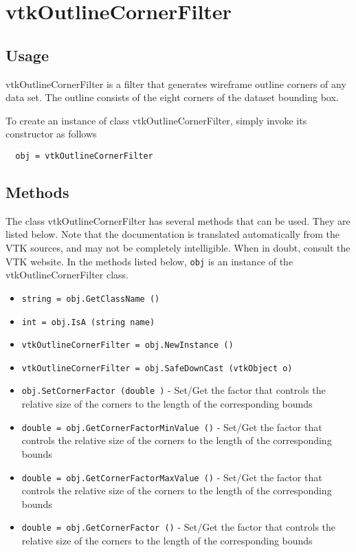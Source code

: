 \section{vtkOutlineCornerFilter}

\subsection{Usage}

 vtkOutlineCornerFilter is a filter that generates wireframe outline corners of any 
 data set. The outline consists of the eight corners of the dataset 
 bounding box.

To create an instance of class vtkOutlineCornerFilter, simply
invoke its constructor as follows
\begin{verbatim}
  obj = vtkOutlineCornerFilter
\end{verbatim}
\subsection{Methods}

The class vtkOutlineCornerFilter has several methods that can be used.
  They are listed below.
Note that the documentation is translated automatically from the VTK sources,
and may not be completely intelligible.  When in doubt, consult the VTK website.
In the methods listed below, \verb|obj| is an instance of the vtkOutlineCornerFilter class.
\begin{itemize}
\item  \verb|string = obj.GetClassName ()|

\item  \verb|int = obj.IsA (string name)|

\item  \verb|vtkOutlineCornerFilter = obj.NewInstance ()|

\item  \verb|vtkOutlineCornerFilter = obj.SafeDownCast (vtkObject o)|

\item  \verb|obj.SetCornerFactor (double )| -  Set/Get the factor that controls the relative size of the corners
 to the length of the corresponding bounds

\item  \verb|double = obj.GetCornerFactorMinValue ()| -  Set/Get the factor that controls the relative size of the corners
 to the length of the corresponding bounds

\item  \verb|double = obj.GetCornerFactorMaxValue ()| -  Set/Get the factor that controls the relative size of the corners
 to the length of the corresponding bounds

\item  \verb|double = obj.GetCornerFactor ()| -  Set/Get the factor that controls the relative size of the corners
 to the length of the corresponding bounds

\end{itemize}
